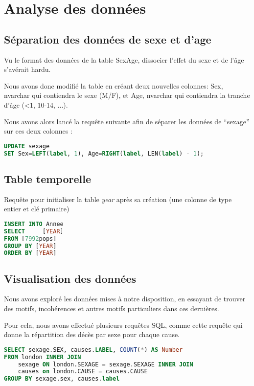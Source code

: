 \chapter{Analyse des données}

\section{Séparation des données de sexe et d'age}

    Vu le format des données de la table SexAge, dissocier l'effet du sexe et de l'âge s'avérait hardu.

    Nous avons donc modifié la table en créant deux nouvelles colonnes: Sex, nvarchar qui contiendra le sexe (M/F), et Age,
    nvarchar qui contiendra la tranche d'âge (<1, 10-14, ...).

    Nous avons alors lancé la requête suivante afin de séparer les données de ``sexage'' sur ces deux colonnes :

    \begin{lstlisting}[frame=single, language=SQL]
UPDATE sexage
SET Sex=LEFT(label, 1), Age=RIGHT(label, LEN(label) - 1);
    \end{lstlisting}

\section{Table temporelle}

    Requête pour initialiser la table \textit{year} après sa création (une colonne de type entier et clé primaire)

    \begin{lstlisting}[frame=single, language=SQL]
INSERT INTO Annee
SELECT     [YEAR]
FROM [7992pops]
GROUP BY [YEAR]
ORDER BY [YEAR]
    \end{lstlisting}

\section{Visualisation des données}

    Nous avons exploré les données mises à notre disposition, en essayant de trouver des motifs, incohérences et autres motifs particuliers
    dans ces dernières.

    Pour cela, nous avons effectué plusieurs requêtes SQL, comme cette requête qui donne la répartition des décès par sexe pour chaque
    cause.

    \begin{lstlisting}[frame=single, language=SQL]
SELECT sexage.SEX, causes.LABEL, COUNT(*) AS Number
FROM london INNER JOIN
    sexage ON london.SEXAGE = sexage.SEXAGE INNER JOIN
    causes on london.CAUSE = causes.CAUSE
GROUP BY sexage.sex, causes.label
    \end{lstlisting}

